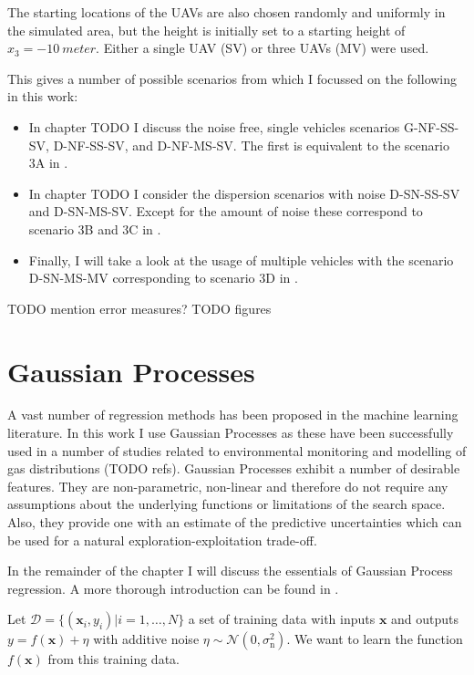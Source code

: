 \documentclass[11pt,a4paper]{scrreprt}
\newcommand{\vc}[1]{\bm{#1}}
\newcommand{\ped}[1]{_{\mathrm{#1}}}
\begin{document}
The starting locations of the UAVs are also chosen randomly and uniformly in the 
simulated area, but the height is initially set to a starting height of $x_3 
= \SI{-10}{meter}$. Either a single UAV (SV) or three UAVs (MV) were used.

This gives a number of possible scenarios from which I focussed on the following 
in this work:
\begin{itemize}
    \item In chapter TODO I discuss the noise free, single vehicles scenarios 
        G-NF-SS-SV, D-NF-SS-SV, and D-NF-MS-SV\@. The first is equivalent to the 
        scenario 3A in \textcite{denardi2013rn}.
    \item In chapter TODO I consider the dispersion scenarios with noise 
        D-SN-SS-SV and D-SN-MS-SV\@. Except for the amount of noise these 
        correspond to scenario 3B and 3C in \textcite{denardi2013rn}.
    \item Finally, I will take a look at the usage of multiple vehicles with the 
        scenario D-SN-MS-MV corresponding to scenario 3D in 
        \textcite{denardi2013rn}.
\end{itemize}

TODO mention error measures?
TODO figures

\chapter{Gaussian Processes}
A vast number of regression methods has been proposed in the machine learning 
literature. In this work I use Gaussian Processes as these have been 
successfully used in a number of studies related to environmental monitoring and 
modelling of gas distributions (TODO refs). Gaussian Processes exhibit a number 
of desirable features. They are non-parametric, non-linear and therefore do not 
require any assumptions about the underlying functions or limitations of the 
search space. Also, they provide one with an estimate of the predictive 
uncertainties which can be used for a natural exploration-exploitation 
trade-off.

In the remainder of the chapter I will discuss the essentials of Gaussian 
Process regression. A more thorough introduction can be found in 
\textcite{Rasmussen:2006vz}.

Let $\mathcal{D} = \{(\vc{x}_i, y_i) | i = 1, \dots, N\}$ a set of training data 
with inputs $\vc x$ and outputs $y = f(\vc x) + \eta$ with additive noise $\eta 
\sim \mathcal{N}(0, \sigma\ped{n}^2)$. We want to learn the function $f(\vc x)$ 
from this training data.
\end{document}
